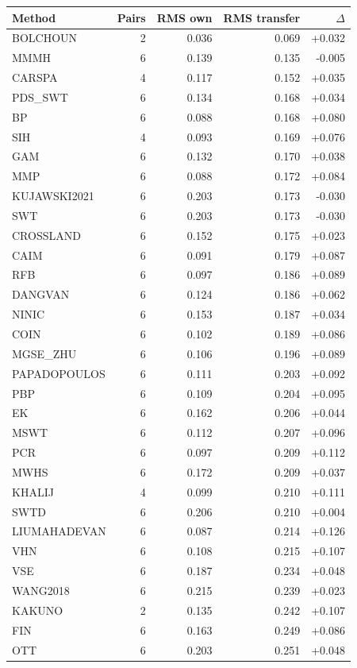 \begin{tabular}{lrrrr}
\hline
Method & Pairs & RMS own & RMS transfer & $\Delta$ \\
\hline
BOLCHOUN & 2 & 0.036 & 0.069 & +0.032 \\
MMMH & 6 & 0.139 & 0.135 & -0.005 \\
CARSPA & 4 & 0.117 & 0.152 & +0.035 \\
PDS_SWT & 6 & 0.134 & 0.168 & +0.034 \\
BP & 6 & 0.088 & 0.168 & +0.080 \\
SIH & 4 & 0.093 & 0.169 & +0.076 \\
GAM & 6 & 0.132 & 0.170 & +0.038 \\
MMP & 6 & 0.088 & 0.172 & +0.084 \\
KUJAWSKI2021 & 6 & 0.203 & 0.173 & -0.030 \\
SWT & 6 & 0.203 & 0.173 & -0.030 \\
CROSSLAND & 6 & 0.152 & 0.175 & +0.023 \\
CAIM & 6 & 0.091 & 0.179 & +0.087 \\
RFB & 6 & 0.097 & 0.186 & +0.089 \\
DANGVAN & 6 & 0.124 & 0.186 & +0.062 \\
NINIC & 6 & 0.153 & 0.187 & +0.034 \\
COIN & 6 & 0.102 & 0.189 & +0.086 \\
MGSE_ZHU & 6 & 0.106 & 0.196 & +0.089 \\
PAPADOPOULOS & 6 & 0.111 & 0.203 & +0.092 \\
PBP & 6 & 0.109 & 0.204 & +0.095 \\
EK & 6 & 0.162 & 0.206 & +0.044 \\
MSWT & 6 & 0.112 & 0.207 & +0.096 \\
PCR & 6 & 0.097 & 0.209 & +0.112 \\
MWHS & 6 & 0.172 & 0.209 & +0.037 \\
KHALIJ & 4 & 0.099 & 0.210 & +0.111 \\
SWTD & 6 & 0.206 & 0.210 & +0.004 \\
LIUMAHADEVAN & 6 & 0.087 & 0.214 & +0.126 \\
VHN & 6 & 0.108 & 0.215 & +0.107 \\
VSE & 6 & 0.187 & 0.234 & +0.048 \\
WANG2018 & 6 & 0.215 & 0.239 & +0.023 \\
KAKUNO & 2 & 0.135 & 0.242 & +0.107 \\
FIN & 6 & 0.163 & 0.249 & +0.086 \\
OTT & 6 & 0.203 & 0.251 & +0.048 \\

\end{tabular}

